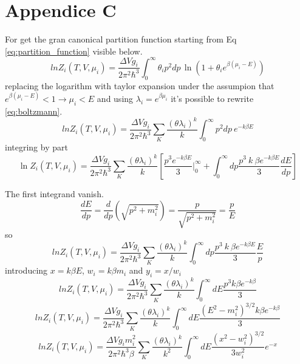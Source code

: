 \documentclass[12pt,a4paper]{book}
\begin{document}
	\section{Appendice C} \label{app:C}
	For get the gran canonical partition function starting from Eq \ref{eq:partition_function} visible below.
	\begin{equation}
		ln Z_i(T,V,\mu_i)= \frac{\Delta V g_i}{2\pi^2\hbar^3} \int_{0}^{\infty} \theta_i p^2 dp \,  \ln(1+\theta_i e^{\beta(\mu_i-E)})
	\end{equation}
	replacing the logarithm with taylor expansion under the assumpion that $e^{\beta(\mu_i-E)} < 1 \rightarrow \mu_i < E$ and using $\lambda_i= e^{\beta \mu_i}$ it's possible to rewrite \ref{eq:boltzmann}.
	\begin{equation}
		ln Z_i(T,V,\mu_i)= \frac{\Delta V g_i}{2\pi^2\hbar^3} \sum_{K} \frac{(\theta \lambda_i)^k}{k} \int_{0}^{\infty} p^2 dp \  e^{-k \beta E}
	\end{equation}
	integring by part
	\begin{equation}
		\ln Z_i(T,V,\mu_i) = \frac{\Delta V g_i}{2\pi^2\hbar^3} \sum_{K} \frac{(\theta \lambda_i)^k}{k} \left[\frac{p^3 e^{-k \beta E}}{3} \Big|_0^\infty + \int_{0}^{\infty} dp \frac{p^3 \  k \  \beta e^{-k \beta E}}{3} \frac{dE}{dp} \right]
	\end{equation}
	
	The first integrand vanish.
	\begin{equation}
		\frac{dE}{dp} = \frac{d}{dp} (\sqrt{p^2+m_i^2}) = \frac{p}{\sqrt{p^2+m_i^2}} = \frac{p}{E}
	\end{equation}
	so
	\begin{equation}
		ln Z_i(T,V,\mu_i)= \frac{\Delta V g_i}{2\pi^2\hbar^3} \sum_{K} \frac{(\theta \lambda_i)^k}{k}  \int_{0}^{\infty} dp \frac{p^3 \  k \  \beta e^{-k \beta E}}{3} \frac{E}{p} 
	\end{equation}
	introducing $x= k\beta E$, $w_i=k\beta m_i$ and $y_i=x/w_i$
	\begin{equation}
		ln Z_i(T,V,\mu_i)= \frac{\Delta V g_i}{2\pi^2\hbar^3} \sum_{K} \frac{(\theta \lambda_i)^k}{k}  \int_{0}^{\infty} dE \frac{p^3 k \beta e^{-k \beta}}{3} 
	\end{equation}
	\begin{equation}
		ln Z_i(T,V,\mu_i)= \frac{\Delta V g_i}{2\pi^2\hbar^3} \sum_{K} \frac{(\theta \lambda_i)^k}{k}  \int_{0}^{\infty} dE \frac{(E^2-m_i^2)^{3/2} k \beta e^{-k \beta}}{3} 
	\end{equation}
	\begin{equation}
		ln Z_i(T,V,\mu_i)= \frac{\Delta V g_i m_i^2}{2\pi^2\hbar^3 \beta} \sum_{K} \frac{(\theta \lambda_i)^k}{k^2}  \int_{0}^{\infty} dE \frac{(x^2-w_i^2)^{3/2}}{3 w_i^2} e^{-x} 
	\end{equation}
	
\end{document}
